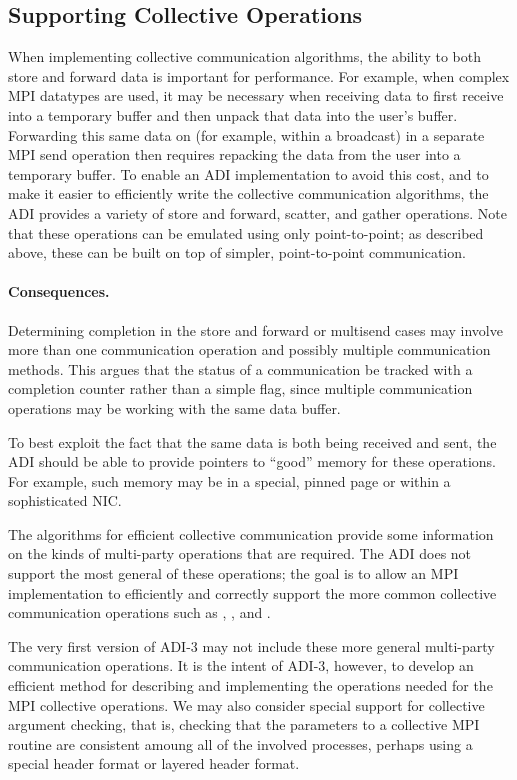 \subsection{Supporting Collective Operations}
When implementing collective communication algorithms, the ability to
both store and forward data is important for performance.  For
example, when complex MPI datatypes are used, it may be necessary when
receiving data to first receive into a temporary buffer and then
unpack that data into the user's buffer.  Forwarding this same data on
(for example, within a broadcast) in a separate MPI send operation
then requires repacking the data from the user into a temporary
buffer.  To enable an ADI implementation to avoid this cost, and to
make it easier to efficiently write the collective communication
algorithms, the ADI provides a variety of store and forward, scatter,
and gather operations.  Note that these operations can be emulated
using only point-to-point; as described above, these can be built on
top of simpler, point-to-point communication.  


\paragraph{Consequences.}
Determining completion in the store and forward or multisend cases may involve
more than one communication 
operation and possibly multiple communication methods.  This argues
that the status of a communication be tracked with a completion
counter rather than a simple flag, since multiple communication
operations may be working with the same data buffer.  

To best exploit the fact that the same data is both being received and
sent, the ADI should be able to provide pointers to ``good'' memory
for these operations.  For example, such memory may be in a special,
pinned page or within a sophisticated NIC.  

The algorithms for efficient collective communication provide some
information on the kinds of multi-party operations that are required.
The ADI does not support the most general of these operations; the
goal is to allow an MPI implementation to efficiently and correctly
support the more common collective communication operations such as
, , and .

The very first version of ADI-3 may not include these more general
multi-party communication operations.  It is the intent of ADI-3,
however, to develop an efficient method for describing and
implementing the operations needed for the MPI collective operations.
We may also consider special support for collective argument checking,
that is, checking that the parameters to a collective MPI routine are
consistent amoung all of the involved processes, perhaps using a
special header format or layered header format.

